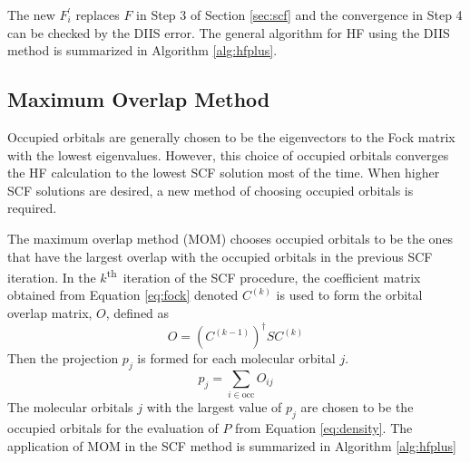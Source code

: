 \documentclass[final,3p,times,twocolumn]{elsarticle}
\newcommand{\ssth}{\textsuperscript{th}}
\begin{document}
The new $F_i^\prime$ replaces $F$ in Step 3 of Section \ref{sec:scf} and the convergence in Step 4 can be checked by the DIIS error. The general algorithm for HF using the DIIS method is summarized in Algorithm \ref{alg:hfplus}.

\subsection{Maximum Overlap Method} \label{sec:mom}
Occupied orbitals are generally chosen to be the eigenvectors to the Fock matrix with the lowest eigenvalues. However, this choice of occupied orbitals converges the HF calculation to the lowest SCF solution most of the time. When higher SCF solutions are desired, a new method of choosing occupied orbitals is required.

The maximum overlap method (MOM) chooses occupied orbitals to be the ones that have the largest overlap with the occupied orbitals in the previous SCF iteration. In the $k$\ssth\ iteration of the SCF procedure, the coefficient matrix obtained from Equation \eqref{eq:fock} denoted $C^{(k)}$ is used to form the orbital overlap matrix, $O$, defined as
\begin{equation} \label{eq:momoverlap}
O = (C^{(k-1)})^\dagger S C^{(k)}
\end{equation}
Then the projection $p_j$ is formed for each molecular orbital $j$.
\begin{equation} \label{eq:momproj}
p_j = \sum_{i \in \text{occ}} O_{ij}
\end{equation}
The molecular orbitals $j$ with the largest value of $p_j$ are chosen to be the occupied orbitals for the evaluation of $P$ from Equation \eqref{eq:density}. The application of MOM in the SCF method is summarized in Algorithm \ref{alg:hfplus}
\end{document}
